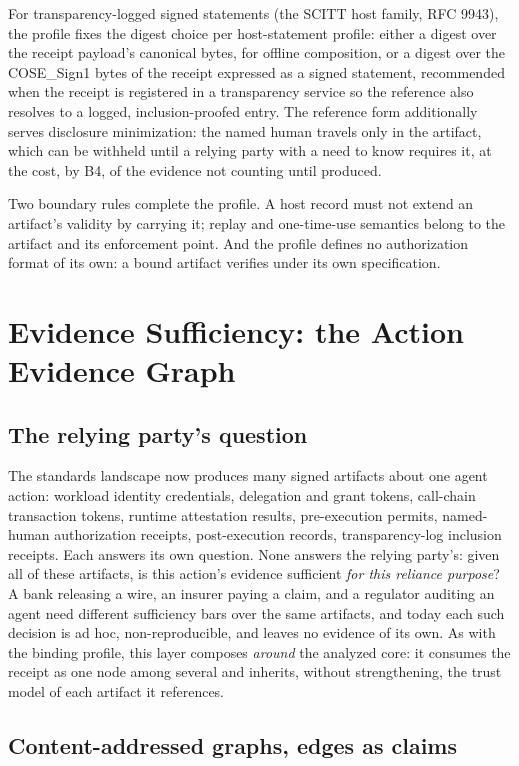 \documentclass[11pt]{article}
\begin{document}
For transparency-logged signed statements (the SCITT host family, RFC 9943), the
profile fixes the digest choice per host-statement profile: either a digest over
the receipt payload's canonical bytes, for offline composition, or a digest over
the COSE\_Sign1 bytes of the receipt expressed as a signed statement, recommended
when the receipt is registered in a transparency service so the reference also
resolves to a logged, inclusion-proofed entry. The reference form additionally
serves disclosure minimization: the named human travels only in the artifact,
which can be withheld until a relying party with a need to know requires it, at the
cost, by B4, of the evidence not counting until produced.

Two boundary rules complete the profile. A host record must not extend an
artifact's validity by carrying it; replay and one-time-use semantics belong to
the artifact and its enforcement point. And the profile defines no authorization
format of its own: a bound artifact verifies under its own specification.

\section{Evidence Sufficiency: the Action Evidence Graph}

\subsection{The relying party's question}

The standards landscape now produces many signed artifacts about one agent action:
workload identity credentials, delegation and grant tokens, call-chain transaction
tokens, runtime attestation results, pre-execution permits, named-human
authorization receipts, post-execution records, transparency-log inclusion
receipts. Each answers its own question. None answers the relying party's: given
all of these artifacts, is this action's evidence sufficient \emph{for this
reliance purpose}? A bank releasing a wire, an insurer paying a claim, and a
regulator auditing an agent need different sufficiency bars over the same
artifacts, and today each such decision is ad hoc, non-reproducible, and leaves no
evidence of its own. As with the binding profile, this layer composes \emph{around}
the analyzed core: it consumes the receipt as one node among several and inherits,
without strengthening, the trust model of each artifact it references.

\subsection{Content-addressed graphs, edges as claims}
\end{document}
